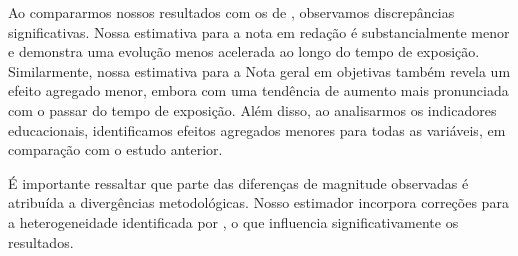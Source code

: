 Ao compararmos nossos resultados com os de \cite{Kawahara_2019}, observamos discrepâncias significativas. Nossa estimativa para a nota em redação é substancialmente menor e demonstra uma evolução menos acelerada ao longo do tempo de exposição. Similarmente, nossa estimativa para a Nota geral em objetivas também revela um efeito agregado menor, embora com uma tendência de aumento mais pronunciada com o passar do tempo de exposição. Além disso, ao analisarmos os indicadores educacionais, identificamos efeitos agregados menores para todas as variáveis, em comparação com o estudo anterior. 

É importante ressaltar que parte das diferenças de magnitude observadas é atribuída a divergências metodológicas. Nosso estimador incorpora correções para a heterogeneidade identificada por \cite{Bacon_2021}, o que influencia significativamente os resultados.

\pagebreak

